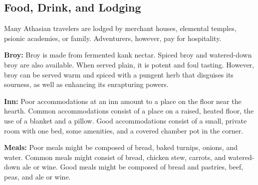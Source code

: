 \subsection{Food, Drink, and Lodging}
Many Athasian travelers are lodged by merchant houses, elemental temples, psionic academies, or family. Adventurers, however, pay for hospitality.


\textbf{Broy:} Broy is made from fermented kank nectar. Spiced broy and watered-down broy are also available. When served plain, it is potent and foul tasting. However, broy can be served warm and spiced with a pungent herb that disguises its sourness, as well as enhancing its enrapturing powers.

\textbf{Inn:} Poor accommodations at an inn amount to a place on the floor near the hearth. Common accommodations consist of a place on a raised, heated floor, the use of a blanket and a pillow. Good accommodations consist of a small, private room with one bed, some amenities, and a covered chamber pot in the corner.

\textbf{Meals:} Poor meals might be composed of bread, baked turnips, onions, and water. Common meals might consist of bread, chicken stew, carrots, and watered-down ale or wine. Good meals might be composed of bread and pastries, beef, peas, and ale or wine.